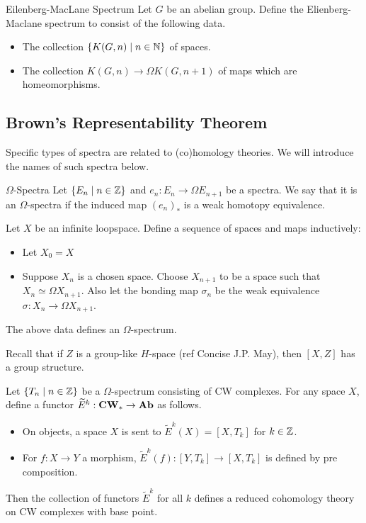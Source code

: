 \documentclass[a4paper]{article}
\begin{document}
\begin{defn}{Eilenberg-MacLane Spectrum}{} Let $G$ be an abelian group. Define the Elienberg-Maclane spectrum to consist of the following data. 
\begin{itemize}
\item The collection $\{K(G,n)\;|\;n\in\mathbb{N}\}$ of spaces. 
\item The collection $K(G,n)\to\Omega K(G,n+1)$ of maps which are homeomorphisms. 
\end{itemize}
\end{defn}

\subsection{Brown's Representability Theorem}
Specific types of spectra are related to (co)homology theories. We will introduce the names of such spectra below. 

\begin{defn}{$\Omega$-Spectra}{} Let $\{E_n\;|\;n\in\mathbb{Z}\}$ and $e_n:E_n\to\Omega E_{n+1}$ be a spectra. We say that it is an $\Omega$-spectra if the induced map $(e_n)_\ast$ is a weak homotopy equivalence. 
\end{defn}

\begin{lmm}{}{} Let $X$ be an infinite loopspace. Define a sequence of spaces and maps inductively:
\begin{itemize}
\item Let $X_0=X$
\item Suppose $X_n$ is a chosen space. Choose $X_{n+1}$ to be a space such that $X_n\simeq\Omega X_{n+1}$. Also let the bonding map $\sigma_n$ be the weak equivalence $\sigma:X_n\to\Omega X_{n+1}$. 
\end{itemize}
The above data defines an $\Omega$-spectrum. 
\end{lmm}

Recall that if $Z$ is a group-like $H$-space (ref Concise J.P. May), then $[X,Z]$ has a group structure. 

\begin{thm}{}{} Let $\{T_n\;|\;n\in\mathbb{Z}\}$ be a $\Omega$-spectrum consisting of CW complexes. For any space $X$, define a functor $\widetilde{E}^k:\bold{CW}_\ast\to\bold{Ab}$ as follows. 
\begin{itemize}
\item On objects, a space $X$ is sent to $\widetilde{E}^k(X)=[X,T_k]$ for $k\in\mathbb{Z}$.
\item For $f:X\to Y$ a morphism, $\widetilde{E}^k(f):[Y,T_k]\to[X,T_k]$ is defined by pre composition.
\end{itemize}
Then the collection of functors $\widetilde{E}^k$ for all $k$ defines a reduced cohomology theory on CW complexes with base point. 
\end{thm}
\end{document}
